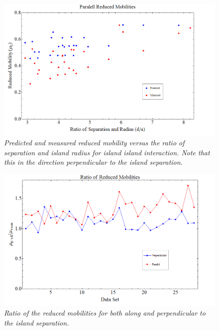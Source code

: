 \documentclass[11pt]{article}
\begin{document}
\begin{figure}
\centering
\includegraphics[scale=0.4]{Images/2IslandRedMobPara.png}
\caption{\textit{Predicted and measured reduced mobility versus the ratio of separation and island radius for island island interaction. Note that this in the direction perpendicular to the island separation.}}
\label{RedMobtau}
\end{figure}

\begin{figure}
\centering
\includegraphics[scale=0.4]{Images/2IslandRedMobRatio.png}
\caption{\textit{Ratio of the reduced mobilities for both along and perpendicular to the island separation.}}
\label{ratio}
\end{figure}
\end{document}
